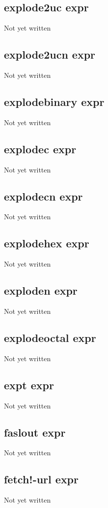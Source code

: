 \documentclass[a4paper,11pt]{article}
\begin{document}
\subsection{\ttfamily explode2uc expr}
Not yet written

\subsection{\ttfamily explode2ucn expr}
Not yet written

\subsection{\ttfamily explodebinary expr}
Not yet written

\subsection{\ttfamily explodec expr}
Not yet written

\subsection{\ttfamily explodecn expr}
Not yet written

\subsection{\ttfamily explodehex expr}
Not yet written

\subsection{\ttfamily exploden expr}
Not yet written

\subsection{\ttfamily explodeoctal expr}
Not yet written

\subsection{\ttfamily expt expr}
Not yet written

\subsection{\ttfamily faslout expr}
Not yet written

\subsection{\ttfamily fetch!-url expr}
Not yet written
\end{document}
